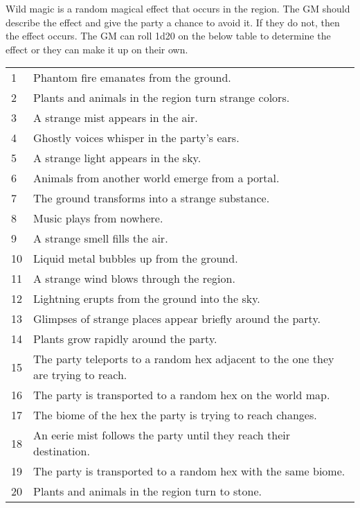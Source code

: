 \begin{multicols}{2}
Wild magic is a random magical effect that occurs in the region. The GM should describe
the effect and give the party a chance to avoid it. If they do not, then the effect
occurs. The GM can roll 1d20 on the below table to determine the effect or they can make it up
on their own.

\begin{center}
{
\begin{xtabular}{|l|l|}
1 & Phantom fire emanates from the ground. \\
2 & Plants and animals in the region turn strange colors. \\
3 & A strange mist appears in the air. \\
4 & Ghostly voices whisper in the party's ears. \\
5 & A strange light appears in the sky. \\
6 & Animals from another world emerge from a portal. \\
7 & The ground transforms into a strange substance. \\
8 & Music plays from nowhere. \\
9 & A strange smell fills the air. \\
10 & Liquid metal bubbles up from the ground. \\
11 & A strange wind blows through the region. \\
12 & Lightning erupts from the ground into the sky. \\
13 & Glimpses of strange places appear briefly around the party. \\
14 & Plants grow rapidly around the party. \\
15 & The party teleports to a random hex adjacent to the one they are trying to reach. \\
16 & The party is transported to a random hex on the world map. \\
17 & The biome of the hex the party is trying to reach changes. \\
18 & An eerie mist follows the party until they reach their destination. \\
19 & The party is transported to a random hex with the same biome. \\
20 & Plants and animals in the region turn to stone. \\
\hline
\end{xtabular}
}
\end{center}


\end{multicols}
